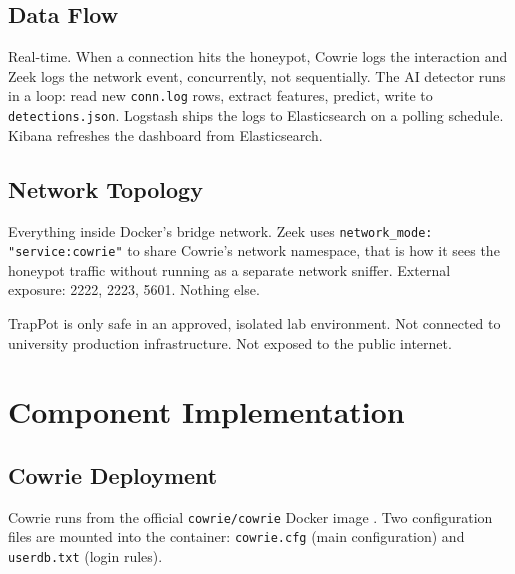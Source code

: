 \subsection{Data Flow}
\label{subsec:component_interaction}

Real-time. When a connection hits the honeypot, Cowrie logs the interaction and Zeek logs the network event, concurrently, not sequentially. The AI detector runs in a loop: read new \texttt{conn.log} rows, extract features, predict, write to \texttt{detections.json}. Logstash ships the logs to Elasticsearch on a polling schedule. Kibana refreshes the dashboard from Elasticsearch.

\subsection{Network Topology}
\label{subsec:network_topology}

Everything inside Docker's bridge network. Zeek uses \texttt{network\_mode: "service:cowrie"} to share Cowrie's network namespace, that is how it sees the honeypot traffic without running as a separate network sniffer. External exposure: 2222, 2223, 5601. Nothing else.

TrapPot is only safe in an approved, isolated lab environment. Not connected to university production infrastructure. Not exposed to the public internet.

\section{Component Implementation}
\label{sec:component_implementation}

\subsection{Cowrie Deployment}
\label{subsec:cowrie_deployment}

Cowrie runs from the official \texttt{cowrie/cowrie} Docker image \cite{9071014,9359711}. Two configuration files are mounted into the container: \texttt{cowrie.cfg} (main configuration) and \texttt{userdb.txt} (login rules).

